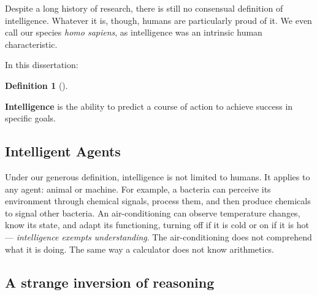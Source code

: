 \documentclass[
  letterpaper,
  12pt,
  british]{tufte-book}
\theoremstyle{plain}
\theoremstyle{plain}
\theoremstyle{definition}
\newtheorem{definition}{Definition}[chapter]
\theoremstyle{remark}
\begin{document}
Despite a long history of research, there is still no consensual
definition of intelligence. Whatever
it is, though, humans are particularly proud of it. We even call our
species \emph{homo sapiens}, as intelligence was an intrinsic human
characteristic.

In this dissertation:

\leavevmode{}%
\begin{definition}[]\label{def-intelligence}

\textbf{Intelligence} is the ability to predict a course of action to
achieve success in specific goals.

\end{definition}

\hypertarget{intelligent-agents}{%
\subsection{Intelligent Agents}\label{intelligent-agents}}

Under our generous definition, intelligence is not limited to humans. It
applies to any agent: animal or machine. For example, a
bacteria can perceive its environment through chemical signals, process
them, and then produce chemicals to signal other bacteria. An
air-conditioning can observe temperature changes, know its state, and
adapt its functioning, turning off if it is cold or on if it is hot ---
\emph{intelligence exempts understanding}. The air-conditioning does not
comprehend what it is doing. The same way a calculator does not know
arithmetics.

\hypertarget{sec-turing_strange_inversion}{%
\subsection{A strange inversion of
reasoning}\label{sec-turing_strange_inversion}}
\end{document}
